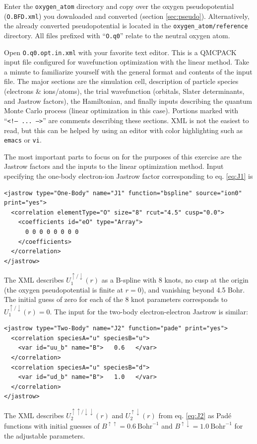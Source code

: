 Enter the \texttt{oxygen\_atom} directory and copy over the oxygen pseudopotential (\texttt{O.BFD.xml}) you downloaded and converted (section \ref{sec:pseudo}).  Alternatively, the already converted pseudopotential is located in the \texttt{oxygen\_atom/reference} directory.  All files prefixed with ``\texttt{O.q0}'' relate to the neutral oxygen atom.  

Open \texttt{O.q0.opt.in.xml} with your favorite text editor.  This is a QMCPACK input file configured for wavefunction optimization with the linear method. Take a minute to familiarize yourself with the general format and contents of the input file.  The major sections are the simulation cell, description of particle species (electrons \& ions/atoms), the trial wavefunction (orbitals, Slater determinants, and Jastrow factors), the Hamiltonian, and finally inputs describing the quantum Monte Carlo process (linear optimization in this case).  Portions marked with ``\texttt{<!-- ... -->}'' are comments describing these sections.  XML is not the easiest to read, but this can be helped by using an editor with color highlighting such as \texttt{emacs} or \texttt{vi}.

The most important parts to focus on for the purposes of this exercise are the Jastrow factors and the inputs to the linear optimization method.  Input specifying the one-body electron-ion Jastrow factor corresponding to eq. \ref{eq:J1} is 
\begin{lstlisting}
<jastrow type="One-Body" name="J1" function="bspline" source="ion0" print="yes">  
  <correlation elementType="O" size="8" rcut="4.5" cusp="0.0">
    <coefficients id="eO" type="Array">                  
      0 0 0 0 0 0 0 0    
    </coefficients>
  </correlation>
</jastrow>
\end{lstlisting}
\noindent
The XML describes $U_1^{\uparrow/\downarrow}(r)$ as a B-spline with 8 knots, no cusp at the origin (the oxygen pseudopotential is finite at $r=0$), and vanishing beyond 4.5 Bohr.  The initial guess of zero for each of the 8 knot parameters corresponds to $U_1^{\uparrow/\downarrow}(r)=0$.  The input for the two-body electron-electron Jastrow is similar:
\begin{lstlisting}
<jastrow type="Two-Body" name="J2" function="pade" print="yes">
  <correlation speciesA="u" speciesB="u">
    <var id="uu_b" name="B">   0.6   </var>
  </correlation>
  <correlation speciesA="u" speciesB="d">
    <var id="ud_b" name="B">   1.0   </var>  
  </correlation>
</jastrow>
\end{lstlisting}
\noindent
The XML describes $U_2^{\uparrow\uparrow/\downarrow\downarrow}(r)$ and  $U_2^{\uparrow\downarrow}(r)$ from eq. \ref{eq:J2} as Pad\'{e} functions with initial guesses of $B^{\uparrow\uparrow}=0.6~\textrm{Bohr}^{-1}$ and  $B^{\uparrow\downarrow}=1.0~\textrm{Bohr}^{-1}$ for the adjustable parameters.  

